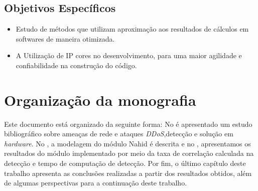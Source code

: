 \subsection{Objetivos Específicos}
\begin{itemize}
	
	\item  Estudo de métodos que utilizam aproximação aos resultados de cálculos em softwares de maneira otimizada.
	
	\item A Utilização de IP cores no desenvolvimento, para uma maior agilidade e confiabilidade na construção do código. 
	
\end{itemize}
\section{Organização da monografia}
Este documento está organizado da seguinte forma: No  é apresentado um estudo bibliográfico sobre ameaças de rede e ataques \textit{DDoS},detecção e solução em \textit{hardware}. No , a modelagem do módulo Nahid é descrita e no , apresentamos os resultados  do módulo implementado por meio da taxa de correlação calculada na detecção e tempo de computação de detecção. Por fim, o último capítulo deste trabalho apresenta as conclusões realizadas a partir dos resultados obtidos, além de algumas perspectivas para a continuação deste trabalho. 